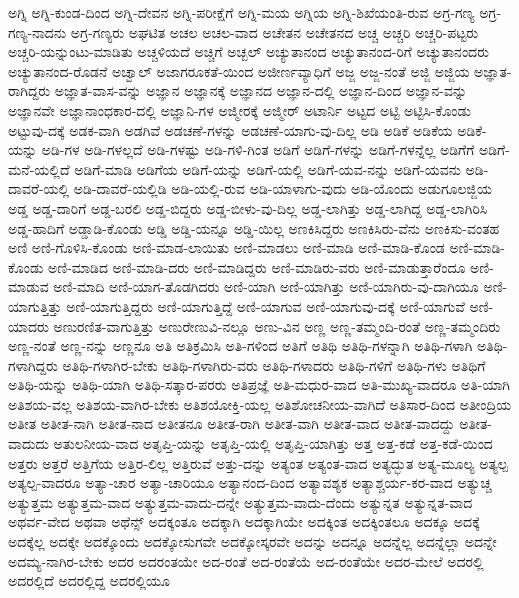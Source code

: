 {ಅಗ್ನಿ
ಅಗ್ನಿ-ಕುಂಡ-ದಿಂದ
ಅಗ್ನಿ-ದೇವನ
ಅಗ್ನಿ-ಪರೀಕ್ಷೆಗೆ
ಅಗ್ನಿ-ಮಯ
ಅಗ್ನಿಯ
ಅಗ್ನಿ-ಶಿಖೆಯಂತಿ-ರುವ
ಅಗ್ರ-ಗಣ್ಯ
ಅಗ್ರ-ಗಣ್ಯ-ನಾದನು
ಅಗ್ರ-ಗಣ್ಯರು
ಅಘಟಿತ
ಅಚಲ
ಅಚಲ-ವಾದ
ಅಚೇತನ
ಅಚೇತನದ
ಅಚ್ಚ
ಅಚ್ಚರಿ
ಅಚ್ಚರಿ-ಪಟ್ಟರು
ಅಚ್ಚರಿ-ಯನ್ನುಂಟು-ಮಾಡಿತು
ಅಚ್ಚಳಿಯದೆ
ಅಚ್ಚಿಗೆ
ಅಚ್ಬಲ್
ಅಚ್ಯುತಾನಂದ
ಅಚ್ಯುತಾನಂದ-ರಿಗೆ
ಅಚ್ಯುತಾನಂದರು
ಅಚ್ಯುತಾನಂದ-ರೊಡನೆ
ಅಚ್ವಾಲ್
ಅಜಾಗರೂಕತೆ-ಯಿಂದ
ಅಜೀರ್ಣವ್ಯಾಧಿಗೆ
ಅಜ್ಜ
ಅಜ್ಜ-ನಂತೆ
ಅಜ್ಜಿ
ಅಜ್ಜಿಯ
ಅಜ್ಞಾತ-ರಾಗಿದ್ದರು
ಅಜ್ಞಾತ-ವಾಸ-ವನ್ನು
ಅಜ್ಞಾನ
ಅಜ್ಞಾನಕ್ಕೆ
ಅಜ್ಞಾನದ
ಅಜ್ಞಾನ-ದಲ್ಲಿ
ಅಜ್ಞಾನ-ದಿಂದ
ಅಜ್ಞಾನ-ವನ್ನು
ಅಜ್ಞಾನವೇ
ಅಜ್ಞಾನಾಂಧಕಾರ-ದಲ್ಲಿ
ಅಜ್ಞಾನಿ-ಗಳ
ಅಜ್ಮೀರಕ್ಕೆ
ಅಜ್ಮೀರ್
ಅಟಾರ್ನಿ
ಅಟ್ಟದ
ಅಟ್ಟಿ
ಅಟ್ಟಿಸಿ-ಕೊಂಡು
ಅಟ್ಟುವು-ದಕ್ಕೆ
ಅಡಕ-ವಾಗಿ
ಅಡಗಿವೆ
ಅಡಚಣೆ-ಗಳನ್ನು
ಅಡಚಣೆ-ಯಾಗು-ವು-ದಿಲ್ಲ
ಅಡಿ
ಅಡಿಕೆ
ಅಡಿಕೆಯ
ಅಡಿಕೆ-ಯನ್ನು
ಅಡಿ-ಗಳ
ಅಡಿ-ಗಳಲ್ಲದೆ
ಅಡಿ-ಗಳಷ್ಟು
ಅಡಿ-ಗಳಿ-ಗಿಂತ
ಅಡಿಗೆ
ಅಡಿಗೆ-ಗಳನ್ನು
ಅಡಿಗೆ-ಗಳನ್ನೆಲ್ಲ
ಅಡಿಗೆಗೆ
ಅಡಿಗೆ-ಮನೆ-ಯಲ್ಲಿದೆ
ಅಡಿಗೆ-ಮಾಡಿ
ಅಡಿಗೆಯ
ಅಡಿಗೆ-ಯನ್ನು
ಅಡಿಗೆ-ಯಲ್ಲಿ
ಅಡಿಗೆ-ಯವ-ನನ್ನು
ಅಡಿಗೆ-ಯವನು
ಅಡಿ-ದಾವರೆ-ಯಲ್ಲಿ
ಅಡಿ-ದಾವರೆ-ಯಲ್ಲಿಡಿ
ಅಡಿ-ಯಲ್ಲಿ-ರುವ
ಅಡಿ-ಯಾಳಾಗು-ವುದು
ಅಡಿ-ಯೊಂದು
ಅಡುಗೂಲಜ್ಜಿಯ
ಅಡ್ಡ
ಅಡ್ಡ-ದಾರಿಗೆ
ಅಡ್ಡ-ಬರಲಿ
ಅಡ್ಡ-ಬಿದ್ದರು
ಅಡ್ಡ-ಬೀಳು-ವು-ದಿಲ್ಲ
ಅಡ್ಡ-ಲಾಗಿತ್ತು
ಅಡ್ಡ-ಲಾಗಿದ್ದ
ಅಡ್ಡ-ಲಾಗಿರಿಸಿ
ಅಡ್ಡ-ಹಾದಿಗೆ
ಅಡ್ಡಾಡಿ-ಕೊಂಡು
ಅಡ್ಡಿ
ಅಡ್ಡಿ-ಯನ್ನೂ
ಅಡ್ಡಿ-ಯಿಲ್ಲ
ಅಣಕಿಸಿದ್ದರು
ಅಣಕಿಸಿರು-ವೆನು
ಅಣಕಿಸು-ವಂತಹ
ಅಣಿ
ಅಣಿ-ಗೊಳಿಸಿ-ಕೊಂಡು
ಅಣಿ-ಮಾಡ-ಲಾಯಿತು
ಅಣಿ-ಮಾಡಲು
ಅಣಿ-ಮಾಡಿ
ಅಣಿ-ಮಾಡಿ-ಕೊಂಡ
ಅಣಿ-ಮಾಡಿ-ಕೊಂಡು
ಅಣಿ-ಮಾಡಿದ
ಅಣಿ-ಮಾಡಿ-ದರು
ಅಣಿ-ಮಾಡಿದ್ದರು
ಅಣಿ-ಮಾಡಿರು-ವರು
ಅಣಿ-ಮಾಡುತ್ತಾರೆಂದೂ
ಅಣಿ-ಮಾಡುವ
ಅಣಿ-ಮಾದಿ
ಅಣಿ-ಯಾಗ-ತೊಡಗಿದರು
ಅಣಿ-ಯಾಗಿ
ಅಣಿ-ಯಾಗಿತ್ತು
ಅಣಿ-ಯಾಗಿರು-ವು-ದಾಗಿಯೂ
ಅಣಿ-ಯಾಗುತ್ತಿತ್ತು
ಅಣಿ-ಯಾಗುತ್ತಿದ್ದರು
ಅಣಿ-ಯಾಗುತ್ತಿದ್ದೆ
ಅಣಿ-ಯಾಗುವ
ಅಣಿ-ಯಾಗುವು-ದಕ್ಕೆ
ಅಣಿ-ಯಾಗುವೆ
ಅಣಿ-ಯಾದರು
ಅಣುರಣಿತ-ವಾಗುತ್ತಿತ್ತು
ಅಣುರೇಣುವಿ-ನಲ್ಲೂ
ಅಣು-ವಿನ
ಅಣ್ಣ
ಅಣ್ಣ-ತಮ್ಮಂದಿ-ರಂತೆ
ಅಣ್ಣ-ತಮ್ಮಂದಿರು
ಅಣ್ಣ-ನಂತೆ
ಅಣ್ಣ-ನನ್ನು
ಅಣ್ಣನೂ
ಅತಿ
ಅತಿಕ್ರಮಿಸಿ
ಅತಿ-ಗಳಿಂದ
ಅತಿಗೆ
ಅತಿಥಿ
ಅತಿಥಿ-ಗಳನ್ನಾಗಿ
ಅತಿಥಿ-ಗಳಾಗಿ
ಅತಿಥಿ-ಗಳಾಗಿದ್ದರು
ಅತಿಥಿ-ಗಳಾಗಿರ-ಬೇಕು
ಅತಿಥಿ-ಗಳಾಗಿರು-ವರು
ಅತಿಥಿ-ಗಳಾದರು
ಅತಿಥಿ-ಗಳಿಗೆ
ಅತಿಥಿ-ಗಳು
ಅತಿಥಿಗೆ
ಅತಿಥಿ-ಯನ್ನು
ಅತಿಥಿ-ಯಾಗಿ
ಅತಿಥಿ-ಸತ್ಕಾರ-ಪರರು
ಅತಿಪ್ರಜ್ಞೆ
ಅತಿ-ಮಧುರ-ವಾದ
ಅತಿ-ಮುಖ್ಯ-ವಾದರೂ
ಅತಿ-ಯಾಗಿ
ಅತಿಶಯ-ವಲ್ಲ
ಅತಿಶಯ-ವಾಗಿರ-ಬೇಕು
ಅತಿಶಯೋಕ್ತಿ-ಯಲ್ಲ
ಅತಿಶೋಚನೀಯ-ವಾಗಿದೆ
ಅತಿಸಾರ-ದಿಂದ
ಅತೀಂದ್ರಿಯ
ಅತೀತ
ಅತೀತ-ನಾಗಿ
ಅತೀತ-ನಾದ
ಅತೀತನೂ
ಅತೀತ-ರಾಗಿ
ಅತೀತ-ವಾಗಿ
ಅತೀತ-ವಾದ
ಅತೀತ-ವಾದದ್ದು
ಅತೀತ-ವಾದುದು
ಅತುಲನೀಯ-ವಾದ
ಅತೃಪ್ತಿ-ಯನ್ನು
ಅತೃಪ್ತಿ-ಯಲ್ಲಿ
ಅತೃಪ್ತಿ-ಯಾಗಿತ್ತು
ಅತ್ತ
ಅತ್ತ-ಕಡೆ
ಅತ್ತ-ಕಡೆ-ಯಿಂದ
ಅತ್ತರು
ಅತ್ತರೆ
ಅತ್ತಿಗೆಯ
ಅತ್ತಿರ-ಲಿಲ್ಲ
ಅತ್ತಿರುವೆ
ಅತ್ತು-ದನ್ನು
ಅತ್ಯಂತ
ಅತ್ಯಂತ-ವಾದ
ಅತ್ಯದ್ಭುತ
ಅತ್ಯ-ಮೂಲ್ಯ
ಅತ್ಯಲ್ಪ
ಅತ್ಯಲ್ಪ-ವಾದರೂ
ಅತ್ಯಾ-ಚಾರ
ಅತ್ಯಾ-ಚಾರಿಯೂ
ಅತ್ಯಾನಂದ-ದಿಂದ
ಅತ್ಯಾವಶ್ಯಕ
ಅತ್ಯಾಶ್ಚರ್ಯ-ಕರ-ವಾದ
ಅತ್ಯುಚ್ಚ
ಅತ್ಯುತ್ತಮ
ಅತ್ಯುತ್ತಮ-ವಾದ
ಅತ್ಯುತ್ತಮ-ವಾದು-ದನ್ನೇ
ಅತ್ಯುತ್ತಮ-ವಾದು-ದೆಂದು
ಅತ್ಯುನ್ನತ
ಅತ್ಯುನ್ನತ-ವಾದ
ಅಥರ್ವ-ವೇದ
ಅಥವಾ
ಅಥೆನ್ಸ್
ಅದಕ್ಕಂತೂ
ಅದಕ್ಕಾಗಿ
ಅದಕ್ಕಾಗಿಯೇ
ಅದಕ್ಕಿಂತ
ಅದಕ್ಕಿಂತಲೂ
ಅದಕ್ಕೂ
ಅದಕ್ಕೆ
ಅದಕ್ಕೆಲ್ಲ
ಅದಕ್ಕೇ
ಅದಕ್ಕೊಂದು
ಅದಕ್ಕೋಸುಗವೇ
ಅದಕ್ಕೋಸ್ಕರವೇ
ಅದನ್ನು
ಅದನ್ನೂ
ಅದನ್ನೆಲ್ಲ
ಅದನ್ನೆಲ್ಲಾ
ಅದನ್ನೇ
ಅದಮ್ಯ-ನಾಗಿರ-ಬೇಕು
ಅದರ
ಅದರಂತಯೇ
ಅದ-ರಂತೆ
ಅದ-ರಂತೆಯೆ
ಅದ-ರಂತೆಯೇ
ಅದರ-ಮೇಲೆ
ಅದರಲ್ಲಿ
ಅದರಲ್ಲಿದೆ
ಅದರಲ್ಲಿದ್ದ
ಅದರಲ್ಲಿಯೂ
}
